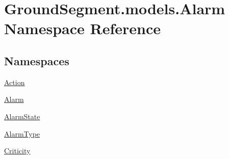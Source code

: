 \hypertarget{namespace_ground_segment_1_1models_1_1_alarm}{}\section{Ground\+Segment.\+models.\+Alarm Namespace Reference}
\label{namespace_ground_segment_1_1models_1_1_alarm}
\subsection*{Namespaces}
\begin{DoxyCompactItemize}
\item 
 \hyperlink{namespace_ground_segment_1_1models_1_1_alarm_1_1_action}{Action}
\item 
 \hyperlink{namespace_ground_segment_1_1models_1_1_alarm_1_1_alarm}{Alarm}
\item 
 \hyperlink{namespace_ground_segment_1_1models_1_1_alarm_1_1_alarm_state}{Alarm\+State}
\item 
 \hyperlink{namespace_ground_segment_1_1models_1_1_alarm_1_1_alarm_type}{Alarm\+Type}
\item 
 \hyperlink{namespace_ground_segment_1_1models_1_1_alarm_1_1_criticity}{Criticity}
\end{DoxyCompactItemize}
